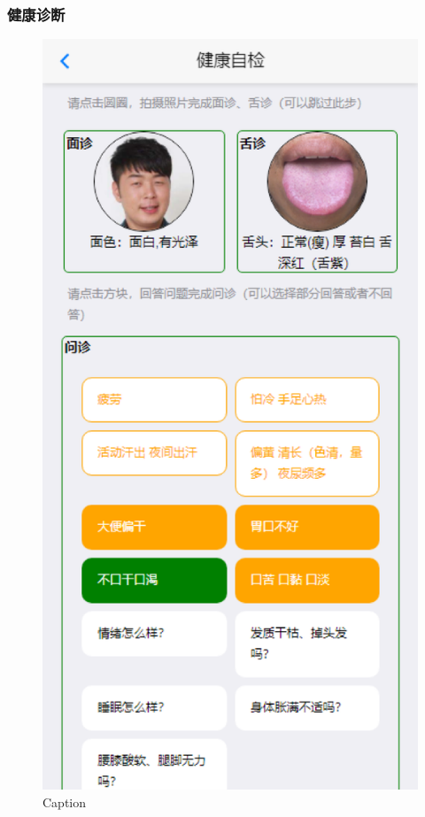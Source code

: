 
\subsubsection{健康诊断}

\begin{figure}
    \centering
    \includegraphics{images/diag.png}
    \caption{Caption}
    \label{fig:diag}
\end{figure}
